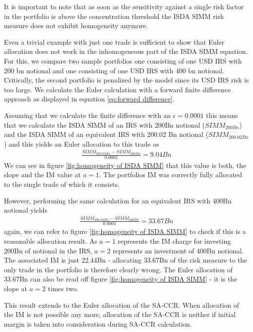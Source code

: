 \documentclass[../Thesis_AHoecherl.tex]{subfiles}
\begin{document}
    It is important to note that as soon as the sensitivity against a single risk factor in the portfolio is above the concentration threshold the ISDA SIMM risk measure does not exhibit homogeneity anymore.
    
    Even a trivial example with just one trade is sufficient to show that Euler allocation does not work in the inhomogeneous part of the ISDA SIMM equation.
    For this, we compare two sample portfolios one consisting of one USD IRS with 200 bn notional and one consisting of one USD IRS with 400 bn notional.
    Critically, the second portfolio is penalized by the model since its USD IRS risk is too large. We calculate the Euler calculation with a forward finite difference approach as displayed in equation \ref{eq:forward difference}.
    
    Assuming that we calculate the finite difference with an $\epsilon = 0.0001$ this means that we calculate the ISDA SIMM of an IRS with 200Bn notional ($SIMM_{200Bn}$) and the ISDA SIMM of an equivalent IRS with 200.02 Bn notional ($SIMM_{200.02Bn}$) and this yields an Euler allocation to this trade as
    \begin{align*}
        \frac{SIMM_{200.02Bn} - SIMM_{200Bn}}{0.0001} = 9.04Bn
    \end{align*}
    We can see in figure \ref{fig:homogeneity of ISDA SIMM} that this value is both, the slope and the IM value at $a = 1$. The portfolios IM was correctly fully allocated to the single trade of which it consists. 
    
    However, performing the same calculation for an equivalent IRS with 400Bn notional yields
    \begin{align*}
        \frac{SIMM_{400.04Bn} - SIMM_{400Bn}}{0.0001} = 33.67Bn
    \end{align*}
    again, we can refer to figure \ref{fig:homogeneity of ISDA SIMM} to check if this is a reasonable allocation result. As $a=1$ represents the IM charge for investing 200Bn of notional in the IRS, $a=2$ represents an investment of 400Bn notional. The associated IM is just 22.44Bn - allocating 33.67Bn of the risk measure to the only trade in the portfolio is therefore clearly wrong. The Euler allocation of 33.67Bn can also be read off figure \ref{fig:homogeneity of ISDA SIMM} - it is the slope at $a=2$ times two.

    This result extends to the Euler allocation of the SA-CCR. When allocation of the IM is not possible any more, allocation of the SA-CCR is neither if initial margin is taken into consideration during SA-CCR calculation.
\end{document}
